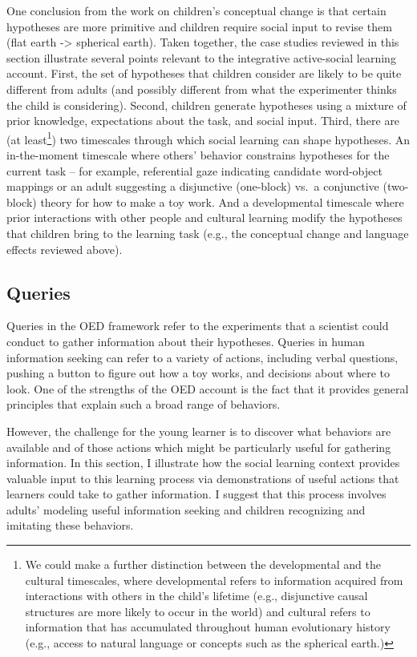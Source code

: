 \documentclass[oneside]{report}
\begin{document}
One conclusion from the work on children's conceptual change is that
certain hypotheses are more primitive and children require social input
to revise them (flat earth -\textgreater{} spherical earth). Taken
together, the case studies reviewed in this section illustrate several
points relevant to the integrative active-social learning account.
First, the set of hypotheses that children consider are likely to be
quite different from adults (and possibly different from what the
experimenter thinks the child is considering). Second, children generate
hypotheses using a mixture of prior knowledge, expectations about the
task, and social input. Third, there are (at least\footnote{We could
  make a further distinction between the developmental and the cultural
  timescales, where developmental refers to information acquired from
  interactions with others in the child's lifetime (e.g., disjunctive
  causal structures are more likely to occur in the world) and cultural
  refers to information that has accumulated throughout human
  evolutionary history (e.g., access to natural language or concepts
  such as the spherical earth.)}) two timescales through which social
learning can shape hypotheses. An in-the-moment timescale where others'
behavior constrains hypotheses for the current task -- for example,
referential gaze indicating candidate word-object mappings or an adult
suggesting a disjunctive (one-block) vs.~a conjunctive (two-block)
theory for how to make a toy work. And a developmental timescale where
prior interactions with other people and cultural learning modify the
hypotheses that children bring to the learning task (e.g., the
conceptual change and language effects reviewed above).

\hypertarget{queries}{%
\subsection{Queries}\label{queries}}

Queries in the OED framework refer to the experiments that a scientist
could conduct to gather information about their hypotheses. Queries in
human information seeking can refer to a variety of actions, including
verbal questions, pushing a button to figure out how a toy works, and
decisions about where to look. One of the strengths of the OED account
is the fact that it provides general principles that explain such a
broad range of behaviors.

However, the challenge for the young learner is to discover what
behaviors are available and of those actions which might be particularly
useful for gathering information. In this section, I illustrate how the
social learning context provides valuable input to this learning process
via demonstrations of useful actions that learners could take to gather
information. I suggest that this process involves adults' modeling
useful information seeking and children recognizing and imitating these
behaviors.
\end{document}
